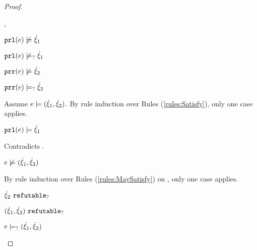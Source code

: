 \begin{proof}
\begin{byCases}
\begin{byCases}
\begin{byCases}
        \item[\cnotsatisfyormay{\hprl{e}}{\hxi_1},\cmaysatisfy{\hprr{e}}{\hxi_2}]
            \begin{pfsteps*}
            \item $\mathtt{prl}(e) \not\models \dot{\xi}_1$  
            \item $\mathtt{prl}(e) \not\models_{?} \dot{\xi}_1$  
            \item $\mathtt{prr}(e) \not\models \dot{\xi}_2$  
            \item $\mathtt{prr}(e) \models_{?} \dot{\xi}_2$  
            \end{pfsteps*}
            Assume $e \models (\dot{\xi}_1 , \dot{\xi}_2)$. By rule induction over Rules (\ref{rules:Satisfy}), only one case applies.
            \begin{byCases}
            \item[\text{(\ref{rule:CSNotIntroPair})}]
                \begin{pfsteps*}
                \item $\mathtt{prl}(e) \models \dot{\xi}_1$ 
                \end{pfsteps*}
                Contradicts .
            \end{byCases}
            \begin{pfsteps*}
            \item $e \not\models (\dot{\xi}_1 , \dot{\xi}_2)$  
            \end{pfsteps*}
            By rule induction over Rules (\ref{rules:MaySatisfy}) on , only one case applies. 
            \begin{byCases}
            \item[\text{(\ref{rule:CMSNotIntro})}]
                \begin{pfsteps*}
                \item $\dot{\xi}_2 ~\mathtt{refutable}_?$  
                \item $(\dot{\xi}_1 , \dot{\xi}_2) ~\mathtt{refutable}_?$  
                \item $e \models_{?} (\dot{\xi}_1 , \dot{\xi}_2)$  

\end{pfsteps*}
\end{byCases}
\end{byCases}
\end{byCases}
\end{byCases}
\end{proof}
